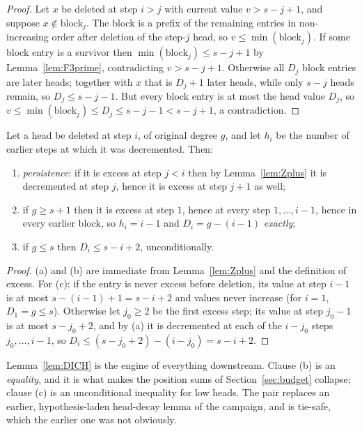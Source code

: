 \begin{proof}
Let $x$ be deleted at step $i > j$ with current value $v > s-j+1$, and suppose
$x \notin \mathrm{block}_j$. The block is a prefix of the remaining entries in
non-increasing order after deletion of the step-$j$ head, so $v \le \min(\mathrm{block}_j)$.
If some block entry is a survivor then $\min(\mathrm{block}_j) \le s-j+1$ by
Lemma~\ref{lem:F3prime}, contradicting $v > s-j+1$. Otherwise all $D_j$ block entries are
later heads; together with $x$ that is $D_j + 1$ later heads, while only $s - j$ heads
remain, so $D_j \le s-j-1$. But every block entry is at most the head value $D_j$, so
$v \le \min(\mathrm{block}_j) \le D_j \le s-j-1 < s-j+1$, a contradiction.
\end{proof}

\begin{lemma}\label{lem:DICH}
Let a head be deleted at step $i$, of original degree $g$, and let $h_i$ be the number of
earlier steps at which it was decremented. Then:
\begin{enumerate}[label=\textup{(\alph*)}]
\item \emph{persistence}: if it is excess at step $j < i$ then by Lemma~\ref{lem:Zplus} it
is decremented at step $j$, hence it is excess at step $j+1$ as well;
\item if $g \ge s+1$ then it is excess at step $1$, hence at every step $1,\dots,i-1$, hence
in every earlier block, so $h_i = i-1$ and $D_i = g - (i-1)$ \emph{exactly};
\item if $g \le s$ then $D_i \le s - i + 2$, unconditionally.
\end{enumerate}
\end{lemma}

\begin{proof}
(a) and (b) are immediate from Lemma~\ref{lem:Zplus} and the definition of excess. For (c):
if the entry is never excess before deletion, its value at step $i-1$ is at most
$s - (i-1) + 1 = s-i+2$ and values never increase (for $i = 1$, $D_1 = g \le s$).
Otherwise let $j_0 \ge 2$ be the first excess step; its value at step $j_0-1$ is at most
$s - j_0 + 2$, and by (a) it is decremented at each of the $i - j_0$ steps
$j_0, \dots, i-1$, so $D_i \le (s-j_0+2) - (i-j_0) = s-i+2$.
\end{proof}

Lemma~\ref{lem:DICH} is the engine of everything downstream. Clause (b) is an
\emph{equality}, and it is what makes the position sums of Section~\ref{sec:budget}
collapse; clause (c) is an unconditional inequality for low heads. The pair replaces an
earlier, hypothesis-laden head-decay lemma of the campaign, and is tie-safe, which the
earlier one was not obviously.

